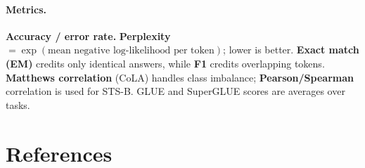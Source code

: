 \documentclass[11pt]{article}
\theoremstyle{plain}
\begin{document}
\paragraph{Metrics.} \textbf{Accuracy / error rate.} \textbf{Perplexity} $= \exp(\text{mean negative log-likelihood per token})$; lower is better.
\textbf{Exact match (EM)} credits only identical answers, while \textbf{F1} credits overlapping tokens. \textbf{Matthews correlation} (CoLA) handles class imbalance;
\textbf{Pearson/Spearman} correlation is used for STS-B. GLUE and SuperGLUE scores are averages over tasks.

\section*{References}
\end{document}
